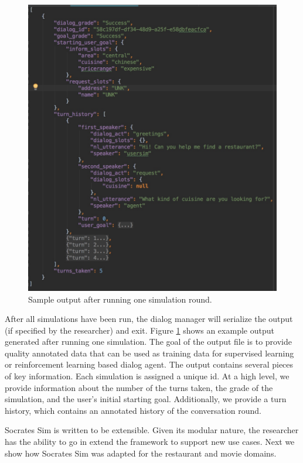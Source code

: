 \begin{figure}[h!]
	\centering
	\includegraphics[scale=.17]{diagrams/sample_save_output.jpeg}
	\caption{ Sample output after running one simulation round. }
	\label{fig:sample_output}
\end{figure}

After all simulations have been run, the dialog manager will serialize the output (if specified by the researcher) and exit. Figure \ref{fig:sample_output} shows an example output generated after running one simulation. The goal of the output file is to provide quality annotated data that can be used as training data for supervised learning or reinforcement learning based dialog agent. The output contains several pieces of key information. Each simulation is assigned a unique id. At a high level, we provide information about the number of the turns taken, the grade of the simulation, and the user's initial starting goal. Additionally, we provide a turn history, which contains an annotated history of the conversation round. 

Socrates Sim is written to be extensible. Given its modular nature, the researcher has the ability to go in extend the framework to support new use cases. Next we show how Socrates Sim was adapted for the restaurant and movie domains. 


